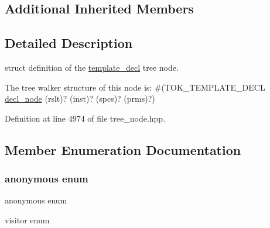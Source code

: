 \subsection*{Additional Inherited Members}


\subsection{Detailed Description}
struct definition of the \hyperlink{structtemplate__decl}{template\+\_\+decl} tree node. 

The tree walker structure of this node is\+: \#(T\+O\+K\+\_\+\+T\+E\+M\+P\+L\+A\+T\+E\+\_\+\+D\+E\+CL \hyperlink{structdecl__node}{decl\+\_\+node} (rslt)? (inst)? (spcs)? (prms)?) 

Definition at line 4974 of file tree\+\_\+node.\+hpp.



\subsection{Member Enumeration Documentation}
\mbox{\label{structtemplate__decl_a8ec7045d377d741033345ff1c3bccf9c}} 
\subsubsection{\texorpdfstring{anonymous enum}{anonymous enum}}
{\footnotesize\ttfamily anonymous enum}



visitor enum 


